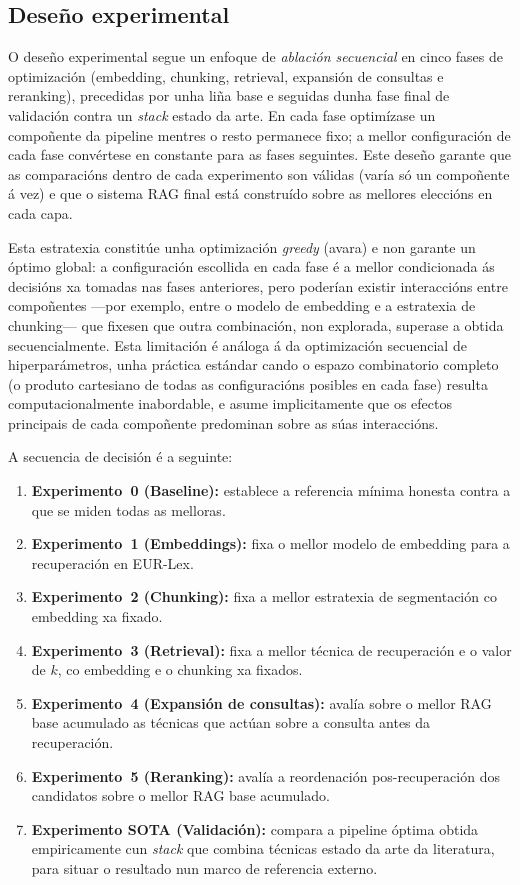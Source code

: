\documentclass[11pt, a4paper, oneside]{report}
\begin{document}
\subsection{Deseño experimental}
\label{sec:deseno_experimental}

O deseño experimental segue un enfoque de \textit{ablación secuencial} en cinco fases
de optimización (embedding, chunking, retrieval, expansión de consultas e reranking),
precedidas por unha liña base e seguidas dunha fase final de validación contra un
\textit{stack} estado da arte. En cada fase optimízase un compoñente da pipeline mentres
o resto permanece fixo; a mellor configuración de cada fase convértese en constante para
as fases seguintes.
Este deseño garante que as comparacións dentro de cada experimento son válidas (varía
só un compoñente á vez) e que o sistema RAG final está construído sobre as mellores
eleccións en cada capa.

Esta estratexia constitúe unha optimización \textit{greedy} (avara) e non garante un
óptimo global: a configuración escollida en cada fase é a mellor condicionada ás
decisións xa tomadas nas fases anteriores, pero poderían existir interaccións entre
compoñentes —por exemplo, entre o modelo de embedding e a estratexia de chunking— que
fixesen que outra combinación, non explorada, superase a obtida secuencialmente. Esta
limitación é análoga á da optimización secuencial de hiperparámetros, unha práctica
estándar cando o espazo combinatorio completo (o produto cartesiano de todas as
configuracións posibles en cada fase) resulta computacionalmente inabordable, e asume
implicitamente que os efectos principais de cada compoñente predominan sobre as súas
interaccións.

A secuencia de decisión é a seguinte:

\begin{enumerate}
  \item \textbf{Experimento~0 (Baseline):} establece a referencia mínima honesta contra
    a que se miden todas as melloras.
  \item \textbf{Experimento~1 (Embeddings):} fixa o mellor modelo de embedding para
    a recuperación en EUR-Lex.
  \item \textbf{Experimento~2 (Chunking):} fixa a mellor estratexia de segmentación
    co embedding xa fixado.
  \item \textbf{Experimento~3 (Retrieval):} fixa a mellor técnica de recuperación e o
    valor de $k$, co embedding e o chunking xa fixados.
  \item \textbf{Experimento~4 (Expansión de consultas):} avalía sobre o mellor RAG base
    acumulado as técnicas que actúan sobre a consulta antes da recuperación.
  \item \textbf{Experimento~5 (Reranking):} avalía a reordenación pos-recuperación dos
    candidatos sobre o mellor RAG base acumulado.
  \item \textbf{Experimento SOTA (Validación):} compara a pipeline óptima obtida
    empiricamente cun \textit{stack} que combina técnicas estado da arte da literatura,
    para situar o resultado nun marco de referencia externo.
\end{enumerate}
\end{document}
